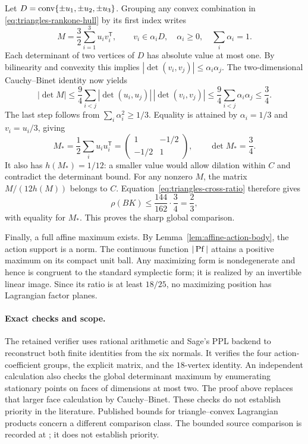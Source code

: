 Let $D=\operatorname{conv}\{\pm u_1,\pm u_2,\pm u_3\}$. Grouping any convex combination
in \eqref{eq:triangles-rankone-hull} by its first index writes
\[
 M=\frac32\sum_{i=1}^3u_i v_i^{\mathsf T},\qquad
 v_i\in\alpha_i D,\quad \alpha_i\geq0,\quad\sum_i\alpha_i=1.
\]
Each determinant of two vertices of $D$ has absolute value at most one.
By bilinearity and convexity this implies $|\det(v_i,v_j)|\leq\alpha_i\alpha_j$.
The two-dimensional Cauchy--Binet identity now yields
\[
 |\det M|
 \leq\frac94\sum_{i<j}|\det(u_i,u_j)|\,|\det(v_i,v_j)|
 \leq\frac94\sum_{i<j}\alpha_i\alpha_j
 \leq\frac34.
\]
The last step follows from $\sum_i\alpha_i^2\geq1/3$.
Equality is attained by $\alpha_i=1/3$ and $v_i=u_i/3$, giving
\[
 M_* =\frac12\sum_i u_i u_i^{\mathsf T}
 =\begin{pmatrix}1&-1/2\\-1/2&1\end{pmatrix},\qquad
 \det M_*=\frac34.
\]
It also has $h(M_*)=1/12$: a smaller value would allow dilation within $C$
and contradict the determinant bound. For any nonzero $M$, the matrix
$M/(12h(M))$ belongs to $C$. Equation~\eqref{eq:triangles-cross-ratio} therefore
gives
\[
 \rho(BK)\leq\frac{144}{162}\cdot\frac34=\frac23,
\]
with equality for $M_*$. This proves the sharp global comparison.

Finally, a full affine maximum exists. By
Lemma~\ref{lem:affine-action-body}, the action support is a norm. The continuous
function $|\operatorname{Pf}|$ attains a positive maximum on its compact unit ball. Any
maximizing form is nondegenerate and hence is congruent to the standard
symplectic form; it is realized by an invertible linear image. Since its
ratio is at least $18/25$, no maximizing position has Lagrangian factor planes.

\paragraph{Exact checks and scope.}
The retained verifier
uses rational arithmetic
and Sage's PPL backend to reconstruct both finite identities from the six
normals. It verifies the four action-coefficient groups, the explicit matrix,
and the $18$-vertex identity. An independent calculation also checks the
global determinant maximum by enumerating stationary points on faces of
dimensions at most two. The proof above replaces that larger face calculation
by Cauchy--Binet. These checks do not establish priority in the literature.
Published bounds for triangle--convex Lagrangian products concern a different
comparison class. The bounded source comparison is recorded at
; it does not establish
priority.
